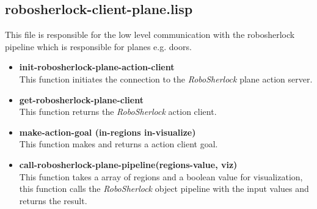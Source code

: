 \documentclass[main.tex]{subfiles}
\begin{document}
		\subsection{robosherlock-client-plane.lisp}
		This file is responsible for the low level communication with the robosherlock pipeline which is responsible for planes e.g. doors.
		\begin{itemize}
			\item \textbf{init-robosherlock-plane-action-client} \\
			This function initiates the connection to the \textit{RoboSherlock} plane action server.
			\item \textbf{get-robosherlock-plane-client} \\
			This function returns the \textit{RoboSherlock} action client.
			\item \textbf{make-action-goal (in-regions in-visualize)} \\
			This function makes and returns a action client goal.
			\item \textbf{call-robosherlock-plane-pipeline(regions-value, viz)} \\
			This function takes a array of regions and a boolean value for visualization, this function calls the \textit{RoboSherlock} object pipeline with the input values and returns the result.
		\end{itemize}
	\endgroup
\end{document}
